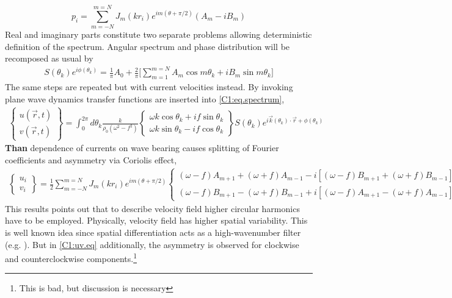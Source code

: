 \begin{equation}
\label{C1:p.eq}
p_i = \sum_{m = -N}^{m = N} J_m(k r_i) e^{im(\theta + \pi/2)} (A_m  - i B_m)
\end{equation}
Real and imaginary parts constitute two separate problems allowing deterministic definition of the spectrum. Angular spectrum and phase distribution will be recomposed as usual by
\begin{align*}
S(\theta_k) e^{i \phi(\theta_k)} = \frac{1}{\pi} A_0 + \frac{2}{\pi} \big[ \sum_{m = 1}^{m = N} A_m \cos m\theta_k + i B_m \sin m\theta_k \big]
\end{align*}
The same steps are repeated but with current velocities instead. By invoking plane wave dynamics 
transfer functions are inserted into \eqref{C1:eq.spectrum},
\begin{align}
\begin{Bmatrix}
u(\vec{r}, t) \\ v(\vec{r}, t)
\end{Bmatrix}
=\int_0^{2\pi} d \theta_k \frac{k}{\rho_0 (\omega^2 - f^2)} 
\begin{Bmatrix}
\omega k \cos \theta_k + i f \sin \theta_k \\ \omega k \sin \theta_k - i f \cos \theta_k
\end{Bmatrix}
S(\theta_k) e^{i \vec{k}(\theta_k) \cdot \vec{r} + \phi(\theta_k)}
\end{align}
\textbf{Than} dependence of currents on wave bearing causes splitting of Fourier coefficients and 
asymmetry via Coriolis effect,
\begin{align}
\label{C1:uv.eq}
\begin{Bmatrix}
u_i \\ v_i
\end{Bmatrix}
= \frac{1}{2} \sum_{m = -N}^{m = N} J_{m} (kr_i) e^{im(\theta + \pi/2)}
\begin{Bmatrix}
(\omega - f) A_{m + 1} + (\omega + f) A_{m - 1} - i [(\omega - f) B_{m + 1} + (\omega + f) B_{m - 1}] \\ 
(\omega - f) B_{m + 1} - (\omega + f) B_{m - 1} + i [ (\omega - f) A_{m + 1} - (\omega + f) A_{m - 1}]
\end{Bmatrix}
\end{align}
This results points out that to describe velocity field higher circular harmonics have to be employed. Physically, velocity field has higher spatial variability. This is well known idea since spatial differentiation acts as a high-wavenumber filter (e.g. \cite{rhines1977dynamics}). But in \eqref{C1:uv.eq} additionally, the asymmetry is observed for clockwise and counterclockwise components.\footnote{This is bad, but discussion is necessary}

